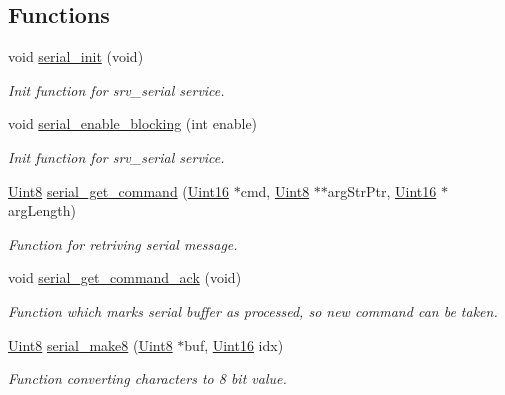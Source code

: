 \subsection*{Functions}
\begin{DoxyCompactItemize}
\item 
void \hyperlink{a00030_ad2b461e9e9044364a28a61cfadcacdd8}{serial\+\_\+init} (void)
\begin{DoxyCompactList}\small\item\em Init function for srv\+\_\+serial service. \end{DoxyCompactList}\item 
void \hyperlink{a00030_af15ca641f181de14f789d97b00c367ef}{serial\+\_\+enable\+\_\+blocking} (int enable)
\begin{DoxyCompactList}\small\item\em Init function for srv\+\_\+serial service. \end{DoxyCompactList}\item 
\hyperlink{a00072_af84840501dec18061d18a68c162a8fa2}{Uint8} \hyperlink{a00030_a366b2707f4c7d76f0efc1b5cdde8e37e}{serial\+\_\+get\+\_\+command} (\hyperlink{a00072_a59a9f6be4562c327cbfb4f7e8e18f08b}{Uint16} $\ast$cmd, \hyperlink{a00072_af84840501dec18061d18a68c162a8fa2}{Uint8} $\ast$$\ast$arg\+Str\+Ptr, \hyperlink{a00072_a59a9f6be4562c327cbfb4f7e8e18f08b}{Uint16} $\ast$arg\+Length)
\begin{DoxyCompactList}\small\item\em Function for retriving serial message. \end{DoxyCompactList}\item 
void \hyperlink{a00030_a7fc7421ed15d6e4516e9878e7455d715}{serial\+\_\+get\+\_\+command\+\_\+ack} (void)
\begin{DoxyCompactList}\small\item\em Function which marks serial buffer as processed, so new command can be taken. \end{DoxyCompactList}\item 
\hyperlink{a00072_af84840501dec18061d18a68c162a8fa2}{Uint8} \hyperlink{a00030_aa76f5237babd71f1484bb2dbc6aa0f8d}{serial\+\_\+make8} (\hyperlink{a00072_af84840501dec18061d18a68c162a8fa2}{Uint8} $\ast$buf, \hyperlink{a00072_a59a9f6be4562c327cbfb4f7e8e18f08b}{Uint16} idx)
\begin{DoxyCompactList}\small\item\em Function converting characters to 8 bit value. \end{DoxyCompactList}\item 
$$
\end{DoxyCompactItemize}
